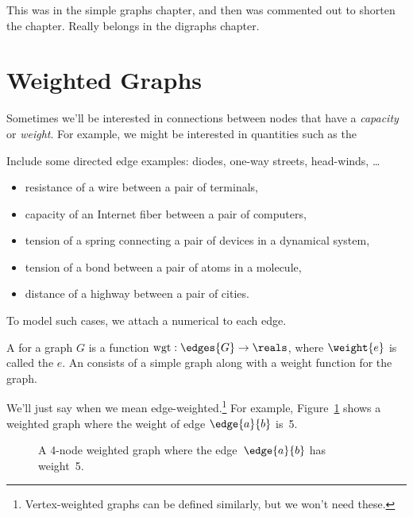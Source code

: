\begin{editingnotes}
This was in the simple graphs chapter, and then was commented out to
shorten the chapter.  Really belongs in the digraphs chapter.
\end{editingnotes}

\section{Weighted Graphs}

Sometimes we'll be interested in connections between nodes that have a
\emph{capacity} or \emph{weight}.  For example, we might be interested in
quantities such as the
\begin{editingnotes}
Include some directed edge examples: diodes, one-way streets, head-winds, \dots
\end{editingnotes}
\begin{itemize}

\item resistance of a wire between a pair of terminals, 

\item capacity of an Internet fiber between a pair of computers,

\item tension of a spring connecting a pair of devices in a dynamical system,

\item tension of a bond between a pair of atoms in a molecule,

\item distance of a highway between a pair of cities.

\end{itemize}
To model such cases, we attach a numerical  to each edge.
\begin{definition}
  A  for a graph $G$ is a function $\text{wgt}:
  \edges{G} \to \reals$, where $\weight{e}$ is called the  $e$.  An  consists of a simple
  graph along with a weight function for the graph.
\end{definition}
We'll just say  when we mean
edge-weighted.\footnote{Vertex-weighted graphs can be defined similarly,
  but we won't need these.}
For example, Figure~\ref{fig:weighted_graph} shows a weighted graph
where the weight of edge $\edge{a}{b}$ is~5.

\begin{figure}


\caption{A 4-node weighted graph where the edge~$\edge{a}{b}$ has
  weight~5.}
\label{fig:weighted_graph}
\end{figure}

